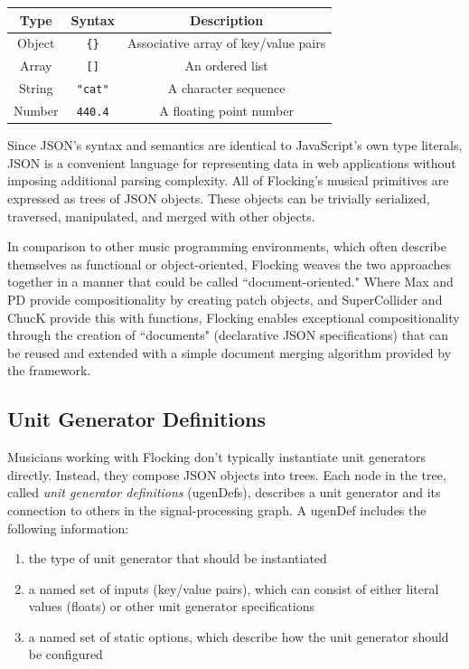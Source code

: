 \documentclass{article}
\begin{document}
\begin{tabular}{| c || c | c |}
    \hline
    \bf{Type} & \bf{Syntax} & \bf{Description} \\ \hline
    Object & \verb|{}| & Associative array of key/value pairs \\ \hline
    Array & \verb|[]| & An ordered list \\ \hline
    String & \verb|"cat"| & A character sequence \\ \hline
    Number & \verb|440.4| & A floating point number \\ \hline
\end{tabular}

Since JSON's syntax and semantics are identical to JavaScript's own type literals, JSON is a convenient language for representing data in web applications without imposing additional parsing complexity. All of Flocking's musical primitives are expressed as trees of JSON objects. These objects can be trivially serialized, traversed, manipulated, and merged with other objects.

In comparison to other music programming environments, which often describe themselves as functional or object-oriented, Flocking weaves the two approaches together in a manner that could be called ``document-oriented." Where Max and PD provide compositionality by creating patch objects, and SuperCollider and ChucK provide this with functions, Flocking enables exceptional compositionality through the creation of ``documents" (declarative JSON specifications) that can be reused and extended with a simple document merging algorithm provided by the framework.

\subsection{Unit Generator Definitions}

Musicians working with Flocking don't typically instantiate unit generators directly. Instead, they compose JSON objects into trees. Each node in the tree, called {\it unit generator definitions} (ugenDefs), describes a unit generator and its connection to others in the signal-processing graph. A ugenDef includes the following information:

\begin{enumerate}
\item the type of unit generator that should be instantiated
\item a named set of inputs (key/value pairs), which can consist of either literal values (floats) or other unit generator specifications
\item a named set of static options, which describe how the unit generator should be configured
\end{enumerate}
\end{document}
